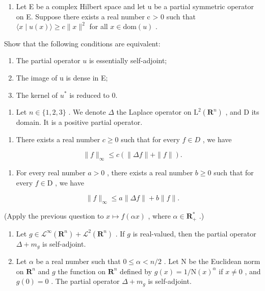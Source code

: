 \begin{enumerate}
\def\labelenumi{\arabic{enumi})}
\setcounter{enumi}{12}
\tightlist
\item
  Let E be a complex Hilbert space and let u be a partial symmetric operator on E. Suppose there exists a real number c \textgreater{} 0 such that \(\langle x \mid u(x) \rangle \geqslant c \|x\|^{2}\) for all \(x \in \text{dom}(u)\) .
\end{enumerate}

Show that the following conditions are equivalent:

\begin{enumerate}
\def\labelenumi{(\roman{enumi})}
\item
  The partial operator \(u\) is essentially self-adjoint;
\item
  The image of u is dense in E;
\item
  The kernel of \(u^{*}\) is reduced to 0.
\end{enumerate}

\begin{enumerate}
\def\labelenumi{\arabic{enumi})}
\setcounter{enumi}{13}
\tightlist
\item
  Let \(n \in \{1, 2, 3\}\) . We denote \(\Delta\) the Laplace operator on \(\mathrm{L}^2(\mathbf{R}^n)\) , and D its domain. It is a positive partial operator.
\end{enumerate}

\begin{enumerate}
\def\labelenumi{\alph{enumi})}
\tightlist
\item
  There exists a real number \(c \geqslant 0\) such that for every \(f \in D\) , we have
\end{enumerate}

\[
\| f \| _ {\infty} \leqslant c (\| \Delta f \| + \| f \|).
\]

\begin{enumerate}
\def\labelenumi{\alph{enumi})}
\setcounter{enumi}{1}
\tightlist
\item
  For every real number \(a > 0\) , there exists a real number \(b \geqslant 0\) such that for every \(f \in \mathrm{D}\) , we have
\end{enumerate}

\[
\| f \| _ {\infty} \leqslant a \| \Delta f \| + b \| f \|.
\]

(Apply the previous question to \(x \mapsto f(\alpha x)\) , where \(\alpha \in \mathbf{R}_{+}^{*}\) .)

\begin{enumerate}
\def\labelenumi{\alph{enumi})}
\setcounter{enumi}{2}
\item
  Let \(g \in \mathcal{L}^{\infty}(\mathbf{R}^{n}) + \mathcal{L}^{2}(\mathbf{R}^{n})\) . If \(g\) is real-valued, then the partial operator \(\Delta + m_{g}\) is self-adjoint.
\item
  Let \(\alpha\) be a real number such that \(0 \leqslant \alpha < n/2\) . Let N be the Euclidean norm on \(\mathbf{R}^n\) and \(g\) the function on \(\mathbf{R}^n\) defined by \(g(x) = 1/\mathrm{N}(x)^\alpha\) if \(x \neq 0\) , and \(g(0) = 0\) . The partial operator \(\Delta + m_g\) is self-adjoint.
\end{enumerate}

